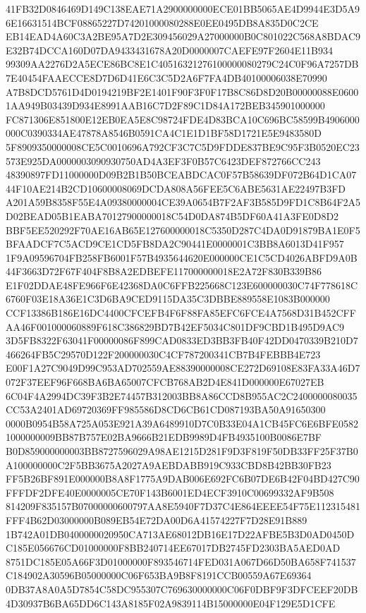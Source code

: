 \documentclass[UTF8,fontset=fandol,zihao=-4,a4paper]{ctexart}
\begin{document}
{{41FB32D0846469D149C138EAE71A2900000000ECE01BB5065AE4D9944E3D5A96E16631514BCF08865227D74201000080288E0EE0495DB8A835D0C2CE
EB14EAD4A60C3A2BE95A7D2E309456029A27000000B0C801022C568A8BDAC9E32B74DCCA160D07DA9433431678A20D0000007CAEFE97F2604E11B934
99309AA2276D2A5ECE86BC8E1C40516321276100000080279C24C0F96A7257DB7E40454FAAECCE8D7D6D41E6C3C5D2A6F7FA4DB40100006038E70990
A7B8DCD5761D4D0194219BF2E1401F90F3F0F17B8C86D8D20B00000088E06001AA949B03439D934E8991AAB16C7D2F89C1D84A172BEB345901000000
FC871306E851800E12EB0EA5E8C98724FDE4D83BCA10C696BC58599B4906000000C0390334AE47878A8546B0591CA4C1E1D1BF58D1721E5E9483580D
5F8909350000008CE5C0010696A792CF3C7C5D9FDDE837BE9C95F3B0520EC23573E925DA0000003090930750AD4A3EF3F0B57C6423DEF872766CC243
48390897FD11000000D09B2B1B50BCEABDCAC0F57B58639DF072B64D1CA0744F10AE214B2CD10600008069DCDA808A56FEE5C6ABE5631AE22497B3FD
A201A59B8358F55E4A09380000004CE39A0654B7F2AF3B585D9FD1C8B64F2A5D02BEAD05B1EABA70127900000018C54D0DA874B5DF60A41A3FE0D8D2
BBF5EE520292F70AE16AB65E127600000018C5350D287C4DA0D91879BA1E0F5BFAADCF7C5ACD9CE1CD5FB8DA2C90441E0000001C3BB8A6013D41F957
1F9A09596704FB258FB6001F57B4935644620E000000CE1C5CD4026ABFD9A0B44F3663D72F67F404F8B8A2EDBEFE117000000018E2A72F830B339B86
E1F02DDAE48FE966F6E42368DA0C6FFB225668C123E600000030C74F778618C6760F03E18A36E1C3D6BA9CED9115DA35C3DBBE889558E1083B000000
CCF13386B186E16DC4400CFCEFB4F6F88FA85EFC6FCE4A7568D31B452CFFAA46F001000060889F618C386829BD7B42EF5034C801DF9CBD1B495D9AC9
3D5FB8322F63041F00000086F899CAD0833ED3BB3FB40F42DD0470339B210D7466264FB5C29570D122F200000030C4CF787200341CB7B4FEBBB4E723
E00F1A27C9049D99C953AD702559AE88390000008CE272D69108E83FA33A46D7072F37EEF96F668BA6BA65007CFCB768AB2D4E841D000000E67027EB
6C04F4A2994DC39F3B2E74457B312003BB8A86CCD8B955AC2C2400000080035CC53A2401AD69720369FF985586D8CD6CB61CD087193BA50A91650300
0000B0954B58A725A053E921A39A6489910D7C0B33E04A1CB45FC6E6BFE05821000000009BB87B757E02BA9666B21EDB9989D4FB4935100B0086E7BF
B0D859000000003BB8727596029A98AE1215D281F9D3F819F50DB33FF25F37B0A100000000C2F5BB3675A2027A9AEBDABB919C933CBD8B42BB30FB23
FF5B26BF891E000000B8A8F1775A9DAB006E692FC6B07DE6B42F04BD427C90FFFDF2DFE40E0000005CE70F143B6001ED4ECF3910C00699332AF9B508
814209F835157B07000000600797AA8E5940F7D37C4E864EEEE54F75E112315481FFF4B62D03000000B089EB54E72DA00D6A41574227F7D28E91B889
1B742A01DB0400000020950CA713AE68012DB16E17D22AFBE5B3D0AD0450DC185E056676CD01000000F8BB240714EE67017DB2745FD2303BA5AED0AD
8751DC185E05A66F3D01000000F893546714FED031A067D66D50BA658F741537C184902A30596B05000000C06F653BA9B8F8191CCB00559A67E69364
0DB37A8A0A5D7854C58DC955307C769630000000C06F0DBF9F3DFCEEF20DB4D30937B6BA65DD6C143A8185F02A9839114B15000000E04F129E5D1CFE
}}
\end{document}
